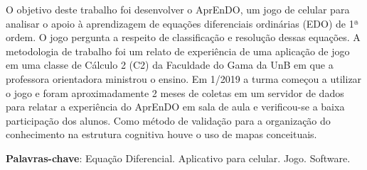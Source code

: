 \begin{resumo}
O objetivo deste trabalho foi desenvolver o AprEnDO, um jogo de celular  para analisar o
 apoio à aprendizagem de equações diferenciais ordinárias (EDO) de 1ª ordem.
 O jogo pergunta a respeito de classificação e resolução dessas equações. A metodologia
 de trabalho foi um relato de experiência de uma aplicação de jogo em uma classe de Cálculo 2 (C2) da Faculdade do Gama da UnB em que a professora orientadora ministrou o ensino. Em 1/2019 a turma começou a utilizar o jogo e foram aproximadamente 2 meses de coletas em um servidor de dados para relatar a experiência do AprEnDO em sala de aula e verificou-se a baixa participação dos alunos. Como método de validação para a organização do conhecimento na estrutura cognitiva houve o uso de mapas conceituais.
	
\begin{comment}
 Com a qualidade de ensino de matemática baixa e contra os métodos muito
 tradicionais de ensino nas salas de aula, resolveu-se desenvolver um 
 aplicativo para celular (iOS e Android) que seja um jogo para o suporte de 
 ensino de equações diferenciais (ED). Será realizada uma pesquisa descritiva
 para o levantamento bibliográfico das características que deverão estar presentes
 no software para dar auxílio a alunos com TDAH junto de técnicas de gamificação 
 para tentar deixar o aprendizado mais prazeroso.
\end{comment}
  
 \begin{comment}
 O resumo deve ressaltar o objetivo, o método, os resultados e as conclusões 
 do documento. A ordem e a extensão
 destes itens dependem do tipo de resumo (informativo ou indicativo) e do
 tratamento que cada item recebe no documento original. O resumo deve ser
 precedido da referência do documento, com exceção do resumo inserido no
 próprio documento. (\ldots) As palavras-chave devem figurar logo abaixo do
 resumo, antecedidas da expressão Palavras-chave:, separadas entre si por
 ponto e finalizadas também por ponto. O texto pode conter no mínimo 150 e 
 no máximo 500 palavras, é aconselhável que sejam utilizadas 200 palavras. 
 E não se separa o texto do resumo em parágrafos.
 \end{comment}

 \vspace{\onelineskip}
    
 \noindent
 \textbf{Palavras-chave}: Equação Diferencial. Aplicativo para celular. Jogo. Software.
\end{resumo}
